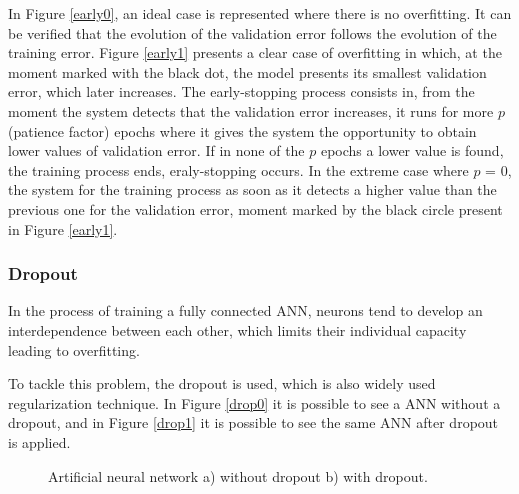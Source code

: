 In Figure \ref{early0}, an ideal case is represented where there is no overfitting. It can be verified that the evolution of the validation error follows the evolution of the training error. Figure \ref{early1} presents a clear case of overfitting in which, at the moment marked with the black dot, the model presents its smallest validation error, which later increases. The early-stopping process consists in, from the moment the system detects that the validation error increases, it runs for more $p$ (patience factor) epochs where it gives the system the opportunity to obtain lower values of validation error. If in none of the $p$ epochs a lower value is found, the training process ends, eraly-stopping occurs. In the extreme case where $p$ = 0, the system for the training process as soon as it detects a higher value than the previous one for the validation error, moment marked by the black circle present in Figure \ref{early1}.


\subsubsection{Dropout}

In the process of training a fully connected \ac{ANN}, neurons tend to develop an interdependence between each other, which limits their individual capacity leading to overfitting.


To tackle this problem, the dropout is used, which is also widely used regularization technique. In Figure \ref{drop0} it is possible to see a \ac{ANN} without a dropout, and in Figure \ref{drop1} it is possible to see the same \ac{ANN} after dropout is applied.

\begin{figure}[h!]
\captionsetup[subfigure]{position=b}
\centering
\label{fig:drop}
\hspace{0.05\textwidth}
\caption{Artificial neural network a) without dropout b) with dropout.}
\end{figure}

